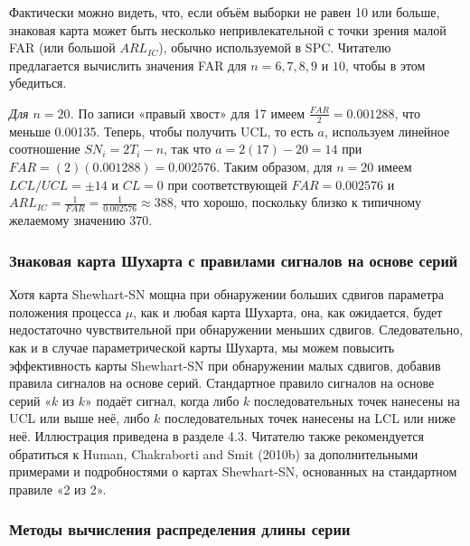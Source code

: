 Фактически можно видеть, что, если объём выборки не равен 10 или больше, знаковая карта может быть несколько непривлекательной с точки зрения малой FAR (или большой \(ARL_{IC}\)), обычно используемой в SPC. Читателю предлагается вычислить значения FAR для \(n = 6, 7, 8, 9\) и \(10\), чтобы в этом убедиться.

\emph{Для \(n = 20\).} По записи «правый хвост» для 17 имеем \(\frac{FAR}{2} = 0.001288\), что меньше 0.00135. Теперь, чтобы получить UCL, то есть \(a\), используем линейное соотношение \(SN_i = 2T_i - n\), так что \(a = 2(17) - 20 = 14\) при \(FAR = (2)(0.001288) = 0.002576\). Таким образом, для \(n = 20\) имеем \(LCL / UCL = \pm 14\) и \(CL = 0\) при соответствующей \(FAR = 0.002576\) и \(ARL_{IC} = \frac{1}{FAR} = \frac{1}{0.002576} \approx 388\), что хорошо, поскольку близко к типичному желаемому значению 370.

\subsubsection{Знаковая карта Шухарта с правилами сигналов на основе серий}
Хотя карта Shewhart-SN мощна при обнаружении больших сдвигов параметра положения процесса \(\mu\), как и любая карта Шухарта, она, как ожидается, будет недостаточно чувствительной при обнаружении меньших сдвигов. Следовательно, как и в случае параметрической карты Шухарта, мы можем повысить эффективность карты Shewhart-SN при обнаружении малых сдвигов, добавив правила сигналов на основе серий. Стандартное правило сигналов на основе серий «\(k\) из \(k\)» подаёт сигнал, когда либо \(k\) последовательных точек нанесены на UCL или выше неё, либо \(k\) последовательных точек нанесены на LCL или ниже неё. Иллюстрация приведена в разделе 4.3. Читателю также рекомендуется обратиться к Human, Chakraborti and Smit (2010b) за дополнительными примерами и подробностями о картах Shewhart-SN, основанных на стандартном правиле «2 из 2».

\subsubsection{Методы вычисления распределения длины серии}
